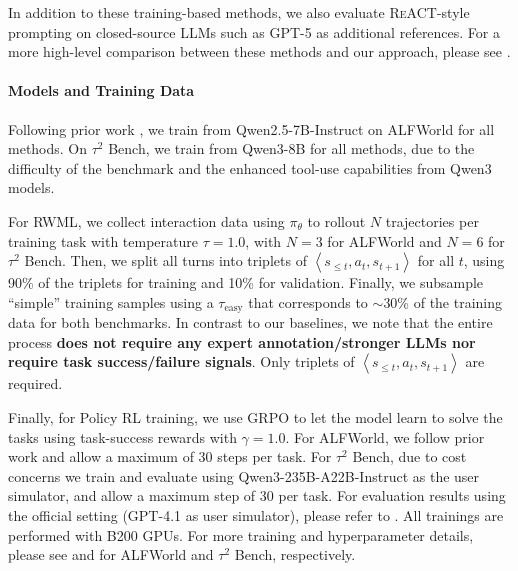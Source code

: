\documentclass{article}
\theoremstyle{plain}
\theoremstyle{definition}
\theoremstyle{remark}
\newcommand{\react}[0]{\textsc{ReACT}}
\newcommand{\policyrl}[0]{Policy RL}
\newcommand{\shortmethod}[0]{RWML}
\newcommand{\wmrlshort}[0]{\shortmethod}
\begin{document}
In addition to these training-based methods, we also evaluate \react{}-style prompting \citep{yao2023reactsynergizingreasoningacting} on closed-source LLMs such as GPT-5 \citep{singh2025openaigpt5card} as additional references.
For a more high-level comparison between these methods and our approach, please see .



\paragraph{Models and Training Data}
Following prior work \cite{feng2025groupingrouppolicyoptimizationllm,yu2025dynamindlearningsimulateexperience,zhang2025agentlearningearlyexperience}, we train from Qwen2.5-7B-Instruct \cite{qwen2025qwen25technicalreport} on ALFWorld for all methods.
On $\tau^2$ Bench, we train from Qwen3-8B \citep{yang2025qwen3technicalreport} for all methods, due to the difficulty of the benchmark and the enhanced tool-use capabilities from Qwen3 models.

For \wmrlshort{}, we collect interaction data using $\pi_\theta$ to rollout $N$ trajectories per training task with temperature $\tau=1.0$, with $N=3$ for ALFWorld and $N=6$ for $\tau^2$ Bench. Then, we split all turns into triplets of $\left\langle s_{\le t}, a_t, s_{t+1} \right\rangle$ for all $t$, using 90\% of the triplets for training and 10\% for validation.
Finally, we subsample ``simple'' training samples using a $\tau_{\mathrm{easy}}$ that corresponds to $\sim$30\% of the training data for both benchmarks.
In contrast to our baselines, we note that the entire process \textbf{does not require any expert annotation/stronger LLMs nor require task success/failure signals}. Only triplets of $\left\langle s_{\le t}, a_t, s_{t+1} \right\rangle$ are required.

Finally, for \policyrl{} training, we use GRPO to let the model learn to solve the tasks using task-success rewards with $\gamma=1.0$. For ALFWorld, we follow prior work \cite{yu2025dynamindlearningsimulateexperience} and allow a maximum of 30 steps per task. For $\tau^2$ Bench, due to cost concerns we train and evaluate using Qwen3-235B-A22B-Instruct \cite{yang2025qwen3technicalreport} as the user simulator, and allow a maximum step of 30 per task. For evaluation results using the official setting (GPT-4.1 as user simulator), please refer to .
All trainings are performed with B200 GPUs.
For more training and hyperparameter details, please see  and  for ALFWorld and $\tau^2$ Bench, respectively.
\end{document}
